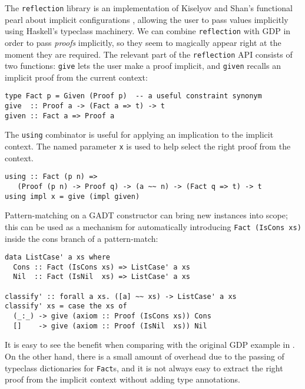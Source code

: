 \documentclass[format=sigplan, review=false, screen=true, 10pt]{acmart}
\makeatletter
\let\origsubsection\subsection
\renewcommand\subsection{\@ifstar{\starsubsection}{\nostarsubsection}}
\newcommand\nostarsubsection[1]
{\subsectionprelude\origsubsection{#1}\subsectionpostlude}
\newcommand\starsubsection[1]
{\subsectionprelude\origsubsection*{#1}\subsectionpostlude}
\newcommand\subsectionprelude{%
  \vspace{-0.25em}
}
\newcommand\subsectionpostlude{%
  \vspace{-0.05em}
}
\makeatother
\begin{document}
\subsection{Using reflection to pass implicit proofs}
The \texttt{reflection} library is an implementation of Kiselyov and Shan's functional pearl about implicit configurations \cite{kiselyov2004functional}, allowing the user to pass values implicitly using Haskell's typeclass machinery.
We can combine \texttt{reflection} with GDP in order to pass \emph{proofs} implicitly, so they seem to magically appear
right at the moment they are required.
 The relevant part of the \texttt{reflection}
API consists of two functions: \texttt{give} lets the user make a proof implicit, and \texttt{given}
recalls an implicit proof from the current context:
\begin{verbatim}
type Fact p = Given (Proof p)  -- a useful constraint synonym
give  :: Proof a -> (Fact a => t) -> t
given :: Fact a => Proof a
\end{verbatim}

The \texttt{using} combinator is useful for applying an implication to the implicit context. The
named parameter \texttt{x} is used to help select the right proof from the context.
\begin{verbatim}
using :: Fact (p n) =>
   (Proof (p n) -> Proof q) -> (a ~~ n) -> (Fact q => t) -> t
using impl x = give (impl given)
\end{verbatim}

Pattern-matching on a GADT constructor can bring new instances into scope;
this can be used as a mechanism for automatically introducing \texttt{Fact (IsCons xs)} inside the cons branch of
a pattern-match:

\begin{verbatim}
data ListCase' a xs where
  Cons :: Fact (IsCons xs) => ListCase' a xs
  Nil  :: Fact (IsNil  xs) => ListCase' a xs

classify' :: forall a xs. ([a] ~~ xs) -> ListCase' a xs
classify' xs = case the xs of
  (_:_) -> give (axiom :: Proof (IsCons xs)) Cons
  []    -> give (axiom :: Proof (IsNil  xs)) Nil
\end{verbatim}

It is easy to see the benefit when comparing  with the original GDP example in .
 On the other hand, there is a small amount of overhead due to the passing of
typeclass dictionaries for \texttt{Fact}s, and it is not always easy to extract the right
proof from the implicit context without adding type annotations.
\end{document}
